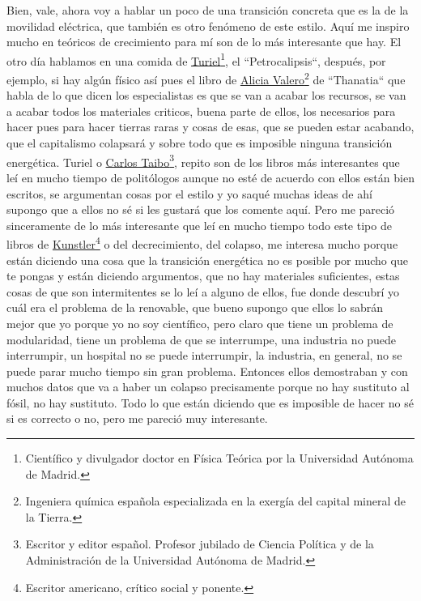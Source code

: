 Bien, vale, ahora voy a hablar un poco de una transición concreta que es la de la movilidad eléctrica, que también es otro fenómeno de este estilo. Aquí me inspiro mucho en teóricos de crecimiento para mí son de lo más interesante que hay.  El otro día hablamos en una comida de \href{https://es.wikipedia.org/wiki/Antonio_Turiel_Mart%C3%ADnez}{Turiel}\footnote{Científico y divulgador doctor en Física Teórica por la Universidad Autónoma de Madrid.}, el ``Petrocalipsis``\cite{martínez2020petrocalipsis}, después, por ejemplo, si hay algún físico así pues el libro de \href{https://es.wikipedia.org/wiki/Alicia_Valero_Delgado}{Alicia Valero}\footnote{Ingeniera química española especializada en la exergía del capital mineral de la Tierra.} de ``Thanatia``\cite{capilla2014thanatia} que habla de lo que dicen los especialistas es que se van a acabar los recursos, se van a acabar todos los materiales criticos, buena parte de ellos, los necesarios para hacer pues para hacer tierras raras y cosas de esas, que se pueden estar acabando, que el capitalismo colapsará y sobre todo que es imposible ninguna transición energética. Turiel o \href{https://en.wikipedia.org/wiki/Carlos_Taibo}{Carlos Taibo}\footnote{Escritor y editor español. Profesor jubilado de Ciencia Política y de la Administración de la Universidad Autónoma de Madrid.}, repito son de los libros más interesantes que leí en mucho tiempo de politólogos aunque no esté de acuerdo con ellos están bien escritos, se argumentan cosas por el estilo y yo saqué muchas ideas de ahí supongo que a ellos no sé si les gustará que los comente aquí. Pero me pareció sinceramente de lo más interesante que leí en mucho tiempo todo este tipo de libros de \href{https://en.wikipedia.org/wiki/James_Howard_Kunstler}{Kunstler}\footnote{Escritor americano, crítico social y ponente.} o del decrecimiento, del colapso, me interesa mucho porque están diciendo una cosa que la transición energética no es posible por mucho que te pongas y están diciendo argumentos, que no hay materiales suficientes, estas cosas de que son intermitentes se lo leí a alguno de ellos, fue donde descubrí yo cuál era el problema de la renovable, que bueno supongo que ellos lo sabrán mejor que yo porque yo no soy científico, pero claro que tiene un problema de modularidad, tiene un problema de que se interrumpe, una industria no puede interrumpir, un hospital no se puede interrumpir, la industria, en general, no se puede parar mucho tiempo sin gran problema. Entonces ellos demostraban y con muchos datos que va a haber un colapso precisamente porque no hay sustituto al fósil, no hay sustituto. Todo lo que están diciendo que es imposible de hacer no sé si es correcto o no, pero me pareció muy interesante.

